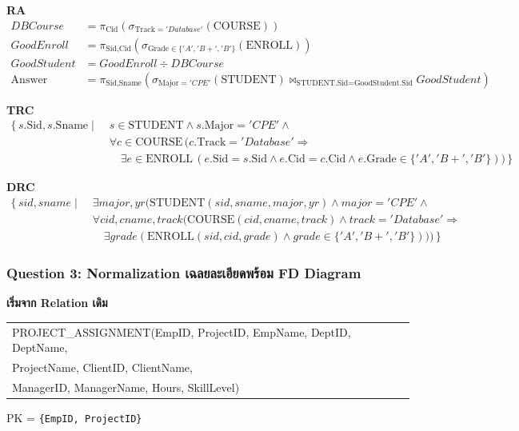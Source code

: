 \documentclass[a4paper,12pt]{article}
\newcommand{\schema}[1]{\texttt{#1}}
\begin{document}
\textbf{RA}
\[
\begin{aligned}
DBCourse &= \pi_{\text{Cid}}(\sigma_{\text{Track}='Database'}(\text{COURSE}))\\
GoodEnroll &= \pi_{\text{Sid},\text{Cid}}(\sigma_{\text{Grade}\in\{'A','B+','B'\}}(\text{ENROLL}))\\
GoodStudent &= GoodEnroll \div DBCourse\\
\text{Answer} &= \pi_{\text{Sid},\text{Sname}}(\sigma_{\text{Major}='CPE'}(\text{STUDENT}) \bowtie_{\text{STUDENT.Sid}=\text{GoodStudent.Sid}} GoodStudent)
\end{aligned}
\]

\textbf{TRC}
\[
\begin{aligned}
\{\, s.\text{Sid},s.\text{Sname} \mid\;& s \in \text{STUDENT} \land s.\text{Major}='CPE' \land\\
&\forall c \in \text{COURSE}\,
(c.\text{Track}='Database' \Rightarrow\\
&\quad \exists e \in \text{ENROLL}\,(e.\text{Sid}=s.\text{Sid} \land e.\text{Cid}=c.\text{Cid} \land e.\text{Grade}\in\{'A','B+','B'\})) \,\}
\end{aligned}
\]

\textbf{DRC}
\[
\begin{aligned}
\{\, sid,sname \mid\;& \exists major,yr(
\text{STUDENT}(sid,sname,major,yr) \land major='CPE' \land\\
&\forall cid,cname,track(\text{COURSE}(cid,cname,track) \land track='Database' \Rightarrow\\
&\quad \exists grade(\text{ENROLL}(sid,cid,grade) \land grade\in\{'A','B+','B'\}))) \,\}
\end{aligned}
\]

\newpage
\subsubsection*{Question 3: Normalization เฉลยละเอียดพร้อม FD Diagram}

\textbf{เริ่มจาก Relation เดิม}
\begin{center}
\small\ttfamily
\begin{tabular}{l}
PROJECT\_ASSIGNMENT(EmpID, ProjectID, EmpName, DeptID, DeptName,\\
\quad ProjectName, ClientID, ClientName,\\
\quad ManagerID, ManagerName, Hours, SkillLevel)
\end{tabular}
\end{center}
\noindent PK = \schema{\{EmpID, ProjectID\}}
\end{document}
